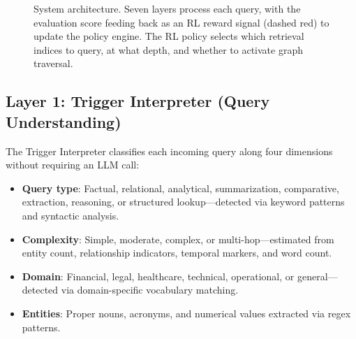 \documentclass[11pt]{article}
\begin{document}
\begin{figure}[t]
    \caption{System architecture. Seven layers process each query, with the evaluation score feeding back as an RL reward signal (dashed red) to update the policy engine. The RL policy selects which retrieval indices to query, at what depth, and whether to activate graph traversal.}
    \label{fig:architecture}
\end{figure}

\subsection{Layer 1: Trigger Interpreter (Query Understanding)}

The Trigger Interpreter classifies each incoming query along four dimensions without requiring an LLM call:

\begin{itemize}
    \item \textbf{Query type}: Factual, relational, analytical, summarization, comparative, extraction, reasoning, or structured lookup---detected via keyword patterns and syntactic analysis.
    \item \textbf{Complexity}: Simple, moderate, complex, or multi-hop---estimated from entity count, relationship indicators, temporal markers, and word count.
    \item \textbf{Domain}: Financial, legal, healthcare, technical, operational, or general---detected via domain-specific vocabulary matching.
    \item \textbf{Entities}: Proper nouns, acronyms, and numerical values extracted via regex patterns.
\end{itemize}
\end{document}
